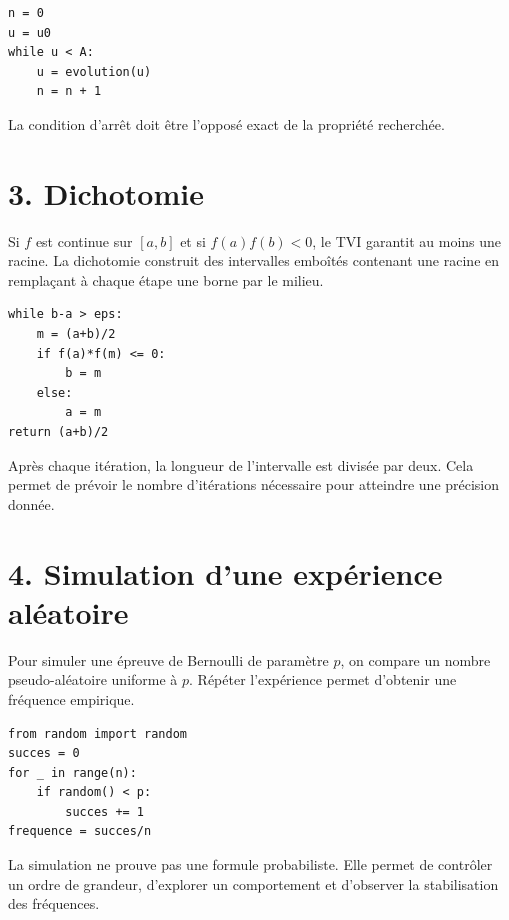 \begin{verbatim}
n = 0
u = u0
while u < A:
    u = evolution(u)
    n = n + 1
\end{verbatim}

La condition d’arrêt doit être l’opposé exact de la propriété recherchée.


\section{3. Dichotomie}
Si $f$ est continue sur $[a,b]$ et si $f(a)f(b)<0$, le TVI garantit au moins une racine. La dichotomie construit des intervalles emboîtés contenant une racine en remplaçant à chaque étape une borne par le milieu.

\begin{verbatim}
while b-a > eps:
    m = (a+b)/2
    if f(a)*f(m) <= 0:
        b = m
    else:
        a = m
return (a+b)/2
\end{verbatim}

Après chaque itération, la longueur de l’intervalle est divisée par deux. Cela permet de prévoir le nombre d’itérations nécessaire pour atteindre une précision donnée.

\section{4. Simulation d’une expérience aléatoire}
Pour simuler une épreuve de Bernoulli de paramètre $p$, on compare un nombre pseudo-aléatoire uniforme à $p$. Répéter l’expérience permet d’obtenir une fréquence empirique.

\begin{verbatim}
from random import random
succes = 0
for _ in range(n):
    if random() < p:
        succes += 1
frequence = succes/n
\end{verbatim}

La simulation ne prouve pas une formule probabiliste. Elle permet de contrôler un ordre de grandeur, d’explorer un comportement et d’observer la stabilisation des fréquences.


